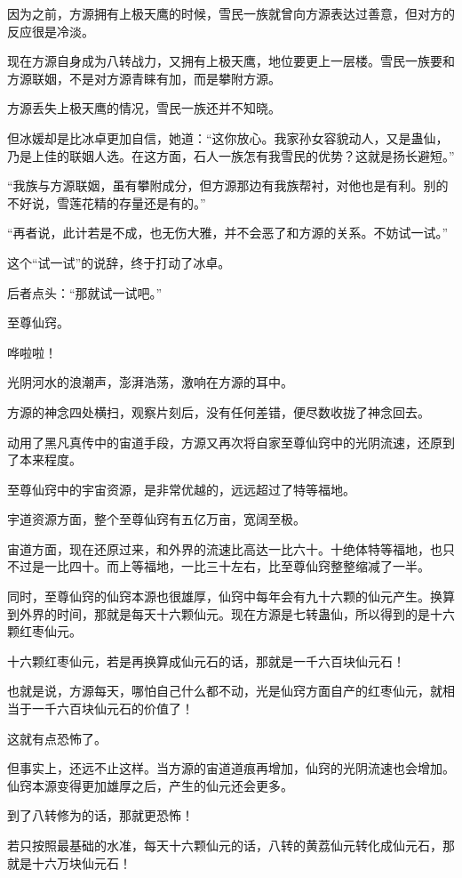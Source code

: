 \begin{this_body}
因为之前，方源拥有上极天鹰的时候，雪民一族就曾向方源表达过善意，但对方的反应很是冷淡。

现在方源自身成为八转战力，又拥有上极天鹰，地位要更上一层楼。雪民一族要和方源联姻，不是对方源青睐有加，而是攀附方源。

方源丢失上极天鹰的情况，雪民一族还并不知晓。

但冰媛却是比冰卓更加自信，她道：“这你放心。我家孙女容貌动人，又是蛊仙，乃是上佳的联姻人选。在这方面，石人一族怎有我雪民的优势？这就是扬长避短。”

“我族与方源联姻，虽有攀附成分，但方源那边有我族帮衬，对他也是有利。别的不好说，雪莲花精的存量还是有的。”

“再者说，此计若是不成，也无伤大雅，并不会恶了和方源的关系。不妨试一试。”

这个“试一试”的说辞，终于打动了冰卓。

后者点头：“那就试一试吧。”

至尊仙窍。

哗啦啦！

光阴河水的浪潮声，澎湃浩荡，激响在方源的耳中。

方源的神念四处横扫，观察片刻后，没有任何差错，便尽数收拢了神念回去。

动用了黑凡真传中的宙道手段，方源又再次将自家至尊仙窍中的光阴流速，还原到了本来程度。

至尊仙窍中的宇宙资源，是非常优越的，远远超过了特等福地。

宇道资源方面，整个至尊仙窍有五亿万亩，宽阔至极。

宙道方面，现在还原过来，和外界的流速比高达一比六十。十绝体特等福地，也只不过是一比四十。而上等福地，一比三十左右，比至尊仙窍整整缩减了一半。

同时，至尊仙窍的仙窍本源也很雄厚，仙窍中每年会有九十六颗的仙元产生。换算到外界的时间，那就是每天十六颗仙元。现在方源是七转蛊仙，所以得到的是十六颗红枣仙元。

十六颗红枣仙元，若是再换算成仙元石的话，那就是一千六百块仙元石！

也就是说，方源每天，哪怕自己什么都不动，光是仙窍方面自产的红枣仙元，就相当于一千六百块仙元石的价值了！

这就有点恐怖了。

但事实上，还远不止这样。当方源的宙道道痕再增加，仙窍的光阴流速也会增加。仙窍本源变得更加雄厚之后，产生的仙元还会更多。

到了八转修为的话，那就更恐怖！

若只按照最基础的水准，每天十六颗仙元的话，八转的黄荔仙元转化成仙元石，那就是十六万块仙元石！


\end{this_body}
